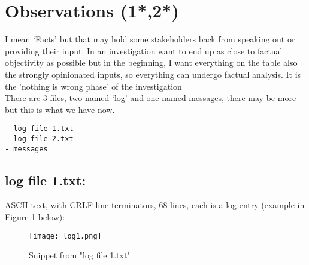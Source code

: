 \documentclass[
	letterpaper, %
	10pt, %
	unnumberedsections, %
	twoside, %
]{APAAssignment}
\begin{document}
\section{Observations (1*,2*)}\label{observations}

I mean `Facts' but that may hold some stakeholders back from speaking out or providing their input. In an investigation want to end up as close to factual objectivity as possible but in the beginning, I want everything on the table also the strongly opinionated inputs, so everything can undergo factual analysis. It is the 'nothing is wrong phase' of the investigation \\

There are 3 files, two named `log' and one named messages, there may be more but this is what we have now.

\begin{verbatim}
- log file 1.txt
- log file 2.txt
- messages
\end{verbatim}

\subsection{log file 1.txt:}\label{log-file-1.txt}
ASCII text, with CRLF line terminators, 68 lines, each is a log entry (example in Figure \ref{fig:log1} below): \\

\begin{figure}[!htp] %
	\centering
	\texttt{[image: log1.png]}
	\caption{Snippet from "log file 1.txt"}	\label{fig:log1}
\end{figure}
\end{document}
